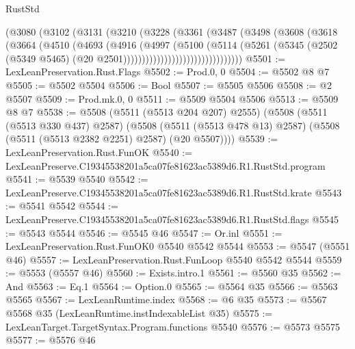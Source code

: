 \begin{lexlean}{RustStd}
\begin{coremodule}
                          (@3080
                            (@3102
                              (@3131
                                (@3210
                                  (@3228
                                    (@3361
                                      (@3487
                                        (@3498
                                          (@3608
                                            (@3618
                                              (@3664
                                                (@4510
                                                  (@4693
                                                    (@4916
                                                      (@4997
                                                        (@5100
                                                          (@5114
                                                            (@5261
                                                              (@5345
                                                                (@2502
                                                                  (@5349 @5465)
                                                                  (@20
                                                                    @2501))))))))))))))))))))))))))))))))
@5501 := LexLeanPreservation.Rust.Flags
@5502 := Prod.{0, 0}
@5504 := @5502 @8 @7
@5505 := @5502 @5504
@5506 := Bool
@5507 := @5505 @5506
@5508 := @2 @5507
@5509 := Prod.mk.{0, 0}
@5511 := @5509 @5504 @5506
@5513 := @5509 @8 @7
@5538 := @5508
    (@5511 (@5513 @204 @207) @2555)
    (@5508
      (@5511 (@5513 @330 @437) @2587)
      (@5508 (@5511 (@5513 @478 @13) @2587) (@5508 (@5511 (@5513 @2382 @2251) @2587) (@20 @5507))))
@5539 := LexLeanPreservation.Rust.FunOK
@5540 := LexLeanPreserve.C19345538201a5ca07fe81623ac5389d6.R1.RustStd.program
@5541 := @5539 @5540
@5542 := LexLeanPreserve.C19345538201a5ca07fe81623ac5389d6.R1.RustStd.krate
@5543 := @5541 @5542
@5544 := LexLeanPreserve.C19345538201a5ca07fe81623ac5389d6.R1.RustStd.flags
@5545 := @5543 @5544
@5546 := @5545 @46
@5547 := Or.inl
@5551 := LexLeanPreservation.Rust.FunOK0 @5540 @5542 @5544
@5553 := @5547 (@5551 @46)
@5557 := LexLeanPreservation.Rust.FunLoop @5540 @5542 @5544
@5559 := @5553 (@5557 @46)
@5560 := Exists.intro.{1}
@5561 := @5560 @35
@5562 := And
@5563 := Eq.{1}
@5564 := Option.{0}
@5565 := @5564 @35
@5566 := @5563 @5565
@5567 := LexLeanRuntime.index
@5568 := @6 @35
@5573 := @5567 @5568 @35 (LexLeanRuntime.instIndexableList @35)
@5575 := LexLeanTarget.TargetSyntax.Program.functions @5540
@5576 := @5573 @5575
@5577 := @5576 @46

\end{coremodule}
\end{lexlean}
